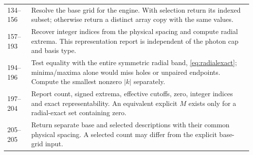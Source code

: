 \begin{longtable}{p{}p{}}
134--156 & Resolve the base grid for the engine. With selection return its indexed subset; otherwise return a distinct array copy with the same values.\\
157--193 & Recover integer indices from the physical spacing and compute radial extrema. This representation report is independent of the photon cap and basis type.\\
194--196 & Test equality with the entire symmetric radial band, \eqref{eq:radialexact}; minima/maxima alone would miss holes or unpaired endpoints. Compute the smallest nonzero $|k|$ separately.\\
197--204 & Report count, signed extrema, effective cutoffs, zero, integer indices and exact representability. An equivalent explicit $M$ exists only for a radial-exact set containing zero.\\
205--205 & Return separate base and selected descriptions with their common physical spacing. A selected count may differ from the explicit base-grid input.\\
\bottomrule\end{longtable}
